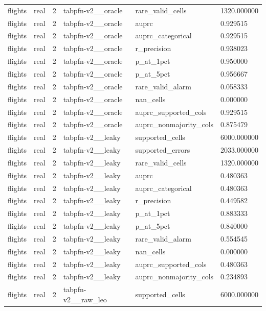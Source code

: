 \begin{tabular}{llllll}
flights & real & 2 & tabpfn-v2\_\_oracle & rare\_valid\_cells & 1320.000000 \\
flights & real & 2 & tabpfn-v2\_\_oracle & auprc & 0.929515 \\
flights & real & 2 & tabpfn-v2\_\_oracle & auprc\_categorical & 0.929515 \\
flights & real & 2 & tabpfn-v2\_\_oracle & r\_precision & 0.938023 \\
flights & real & 2 & tabpfn-v2\_\_oracle & p\_at\_1pct & 0.950000 \\
flights & real & 2 & tabpfn-v2\_\_oracle & p\_at\_5pct & 0.956667 \\
flights & real & 2 & tabpfn-v2\_\_oracle & rare\_valid\_alarm & 0.058333 \\
flights & real & 2 & tabpfn-v2\_\_oracle & nan\_cells & 0.000000 \\
flights & real & 2 & tabpfn-v2\_\_oracle & auprc\_supported\_cols & 0.929515 \\
flights & real & 2 & tabpfn-v2\_\_oracle & auprc\_nonmajority\_cols & 0.875479 \\
flights & real & 2 & tabpfn-v2\_\_leaky & supported\_cells & 6000.000000 \\
flights & real & 2 & tabpfn-v2\_\_leaky & supported\_errors & 2033.000000 \\
flights & real & 2 & tabpfn-v2\_\_leaky & rare\_valid\_cells & 1320.000000 \\
flights & real & 2 & tabpfn-v2\_\_leaky & auprc & 0.480363 \\
flights & real & 2 & tabpfn-v2\_\_leaky & auprc\_categorical & 0.480363 \\
flights & real & 2 & tabpfn-v2\_\_leaky & r\_precision & 0.449582 \\
flights & real & 2 & tabpfn-v2\_\_leaky & p\_at\_1pct & 0.883333 \\
flights & real & 2 & tabpfn-v2\_\_leaky & p\_at\_5pct & 0.840000 \\
flights & real & 2 & tabpfn-v2\_\_leaky & rare\_valid\_alarm & 0.554545 \\
flights & real & 2 & tabpfn-v2\_\_leaky & nan\_cells & 0.000000 \\
flights & real & 2 & tabpfn-v2\_\_leaky & auprc\_supported\_cols & 0.480363 \\
flights & real & 2 & tabpfn-v2\_\_leaky & auprc\_nonmajority\_cols & 0.234893 \\
flights & real & 2 & tabpfn-v2\_\_raw\_leo & supported\_cells & 6000.000000 \\

\end{tabular}
